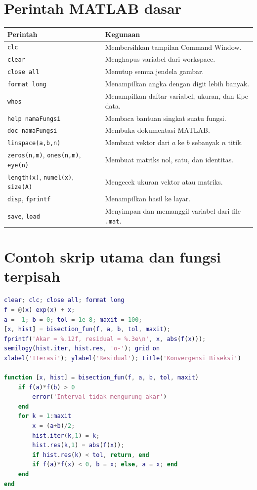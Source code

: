 \documentclass[book,english,noindex,lean,nobackpage,nocopyright,noupdate,nofiglist,notablist]{enacom}
\begin{document}
\section{Perintah MATLAB dasar}
\begin{tabularx}{\textwidth}{p{}X}
\hline
\textbf{Perintah} & \textbf{Kegunaan}\\\hline
\texttt{clc} & Membersihkan tampilan Command Window.\\
\texttt{clear} & Menghapus variabel dari workspace.\\
\texttt{close all} & Menutup semua jendela gambar.\\
\texttt{format long} & Menampilkan angka dengan digit lebih banyak.\\
\texttt{whos} & Menampilkan daftar variabel, ukuran, dan tipe data.\\
\texttt{help namaFungsi} & Membaca bantuan singkat suatu fungsi.\\
\texttt{doc namaFungsi} & Membuka dokumentasi MATLAB.\\
\texttt{linspace(a,b,n)} & Membuat vektor dari $a$ ke $b$ sebanyak $n$ titik.\\
\texttt{zeros(n,m)}, \texttt{ones(n,m)}, \texttt{eye(n)} & Membuat matriks nol, satu, dan identitas.\\
\texttt{length(x)}, \texttt{numel(x)}, \texttt{size(A)} & Mengecek ukuran vektor atau matriks.\\
\texttt{disp}, \texttt{fprintf} & Menampilkan hasil ke layar.\\
\texttt{save}, \texttt{load} & Menyimpan dan memanggil variabel dari file \texttt{.mat}.\\\hline
\end{tabularx}

\section{Contoh skrip utama dan fungsi terpisah}
\begin{lstlisting}[language=Matlab]
% File: main_demo.m
clear; clc; close all; format long
f = @(x) exp(x) + x;
a = -1; b = 0; tol = 1e-8; maxit = 100;
[x, hist] = bisection_fun(f, a, b, tol, maxit);
fprintf('Akar = %.12f, residual = %.3e\n', x, abs(f(x)));
semilogy(hist.iter, hist.res, 'o-'); grid on
xlabel('Iterasi'); ylabel('Residual'); title('Konvergensi Biseksi')

function [x, hist] = bisection_fun(f, a, b, tol, maxit)
    if f(a)*f(b) > 0
        error('Interval tidak mengurung akar')
    end
    for k = 1:maxit
        x = (a+b)/2;
        hist.iter(k,1) = k;
        hist.res(k,1) = abs(f(x));
        if hist.res(k) < tol, return, end
        if f(a)*f(x) < 0, b = x; else, a = x; end
    end
end
\end{lstlisting}
\end{document}
